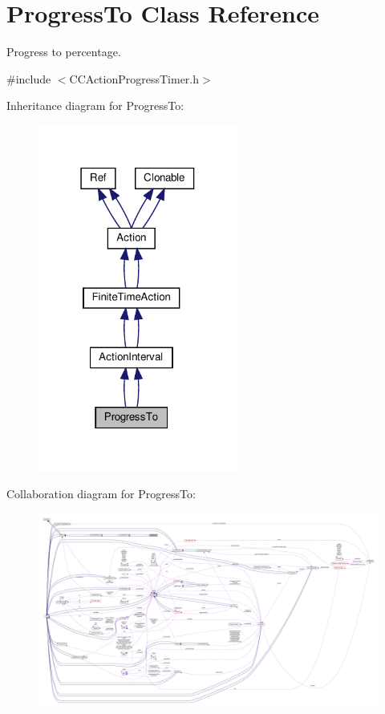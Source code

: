 \hypertarget{classProgressTo}{}\section{Progress\+To Class Reference}
\label{classProgressTo}


Progress to percentage.  




{\ttfamily \#include $<$C\+C\+Action\+Progress\+Timer.\+h$>$}



Inheritance diagram for Progress\+To\+:
\nopagebreak
\begin{figure}[H]
\begin{center}
\leavevmode
\includegraphics[width=186pt]{classProgressTo__inherit__graph}
\end{center}
\end{figure}


Collaboration diagram for Progress\+To\+:
\nopagebreak
\begin{figure}[H]
\begin{center}
\leavevmode
\includegraphics[width=350pt]{classProgressTo__coll__graph}
\end{center}
\end{figure}
